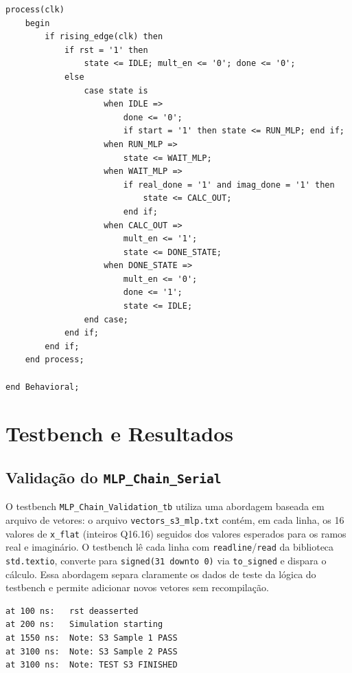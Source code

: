\documentclass[a4paper,12pt]{article}
\begin{document}
\begin{lstlisting}[style=vhdlstyle,
    caption={C\'odigo VHDL do \texttt{BackEnd\_Wrapper}.},
    label={lst:backend}]
    process(clk)
    begin
        if rising_edge(clk) then
            if rst = '1' then
                state <= IDLE; mult_en <= '0'; done <= '0';
            else
                case state is
                    when IDLE =>
                        done <= '0';
                        if start = '1' then state <= RUN_MLP; end if;
                    when RUN_MLP =>
                        state <= WAIT_MLP;
                    when WAIT_MLP =>
                        if real_done = '1' and imag_done = '1' then
                            state <= CALC_OUT;
                        end if;
                    when CALC_OUT =>
                        mult_en <= '1';
                        state <= DONE_STATE;
                    when DONE_STATE =>
                        mult_en <= '0';
                        done <= '1';
                        state <= IDLE;
                end case;
            end if;
        end if;
    end process;

end Behavioral;
\end{lstlisting}


\section{Testbench e Resultados}

\subsection{Valida\c{c}\~ao do \texttt{MLP\_Chain\_Serial}}

O testbench \texttt{MLP\_Chain\_Validation\_tb} utiliza uma abordagem baseada em arquivo de vetores: o arquivo \texttt{vectors\_s3\_mlp.txt} cont\'em, em cada linha, os 16 valores de \texttt{x\_flat} (inteiros Q16.16) seguidos dos valores esperados para os ramos real e imagin\'ario. O testbench l\^e cada linha com \texttt{readline}/\texttt{read} da biblioteca \texttt{std.textio}, converte para \texttt{signed(31 downto 0)} via \texttt{to\_signed} e dispara o c\'alculo. Essa abordagem separa claramente os dados de teste da l\'ogica do testbench e permite adicionar novos vetores sem recompila\c{c}\~ao.

\begin{lstlisting}[style=logstyle,
    caption={Log do ISim -- valida\c{c}\~ao do \texttt{MLP\_Chain\_Serial} (toler\^ancia $\pm500$ LSB em Q16.16).},
    label={lst:log_mlp}]
at 100 ns:   rst deasserted
at 200 ns:   Simulation starting
at 1550 ns:  Note: S3 Sample 1 PASS
at 3100 ns:  Note: S3 Sample 2 PASS
at 3100 ns:  Note: TEST S3 FINISHED
\end{lstlisting}
\end{document}
